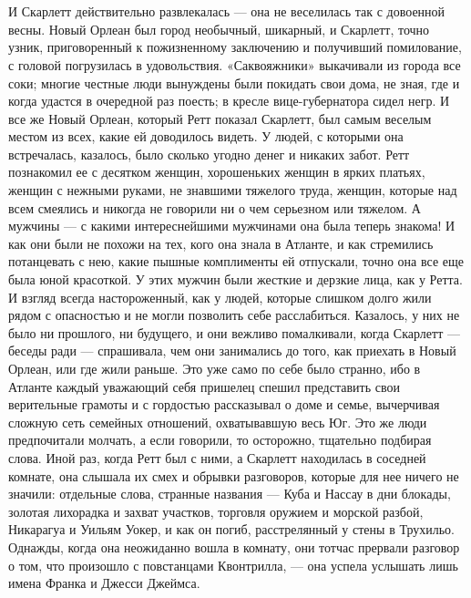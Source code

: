 \chapter{\ }

И Скарлетт действительно развлекалась — она не веселилась так с довоенной весны. Новый Орлеан был город необычный, шикарный, и Скарлетт, точно узник, приговоренный к пожизненному заключению и получивший помилование, с головой погрузилась в удовольствия. «Саквояжники» выкачивали из города все соки; многие честные люди вынуждены были покидать свои дома, не зная, где и когда удастся в очередной раз поесть; в кресле вице-губернатора сидел негр. И все же Новый Орлеан, который Ретт показал Скарлетт, был самым веселым местом из всех, какие ей доводилось видеть. У людей, с которыми она встречалась, казалось, было сколько угодно денег и никаких забот. Ретт познакомил ее с десятком женщин, хорошеньких женщин в ярких платьях, женщин с нежными руками, не знавшими тяжелого труда, женщин, которые над всем смеялись и никогда не говорили ни о чем серьезном или тяжелом. А мужчины — с какими интереснейшими мужчинами она была теперь знакома! И как они были не похожи на тех, кого она знала в Атланте, и как стремились потанцевать с нею, какие пышные комплименты ей отпускали, точно она все еще была юной красоткой.
У этих мужчин были жесткие и дерзкие лица, как у Ретта. И взгляд всегда настороженный, как у людей, которые слишком долго жили рядом с опасностью и не могли позволить себе расслабиться. Казалось, у них не было ни прошлого, ни будущего, и они вежливо помалкивали, когда Скарлетт — беседы ради — спрашивала, чем они занимались до того, как приехать в Новый Орлеан, или где жили раньше. Это уже само по себе было странно, ибо в Атланте каждый уважающий себя пришелец спешил представить свои верительные грамоты и с гордостью рассказывал о доме и семье, вычерчивая сложную сеть семейных отношений, охватывавшую весь Юг. Это же люди предпочитали молчать, а если говорили, то осторожно, тщательно подбирая слова. Иной раз, когда Ретт был с ними, а Скарлетт находилась в соседней комнате, она слышала их смех и обрывки разговоров, которые для нее ничего не значили: отдельные слова, странные названия — Куба и Нассау в дни блокады, золотая лихорадка и захват участков, торговля оружием и морской разбой, Никарагуа и Уильям Уокер, и как он погиб, расстрелянный у стены в Трухильо. Однажды, когда она неожиданно вошла в комнату, они тотчас прервали разговор о том, что произошло с повстанцами Квонтрилла, — она успела услышать лишь имена Франка и Джесси Джеймса.
